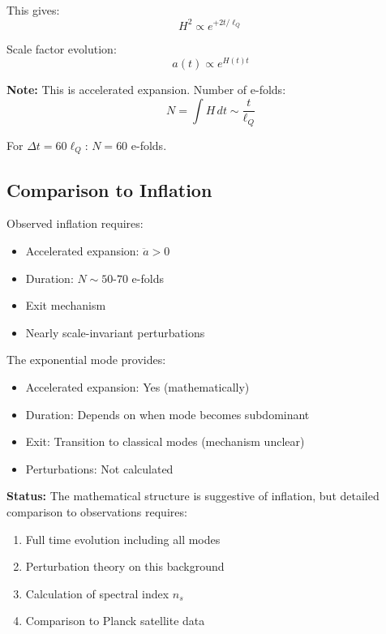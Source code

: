 \documentclass[11pt,a4paper]{article}
\theoremstyle{definition}
\theoremstyle{remark}
\begin{document}
	This gives:
	\begin{equation}
		H^2 \propto e^{+2t/\ell_Q}
	\end{equation}
	
	Scale factor evolution:
	\begin{equation}
		a(t) \propto e^{H(t)t}
	\end{equation}
	
	\textbf{Note:} This is accelerated expansion. Number of e-folds:
	\begin{equation}
		N = \int H\,dt \sim \frac{t}{\ell_Q}
	\end{equation}
	
	For $\Delta t = 60\ell_Q$: $N = 60$ e-folds.
	
	\subsection{Comparison to Inflation}
	
	Observed inflation requires:
	\begin{itemize}
		\item Accelerated expansion: $\ddot{a} > 0$
		\item Duration: $N \sim 50$-$70$ e-folds
		\item Exit mechanism
		\item Nearly scale-invariant perturbations
	\end{itemize}
	
	The exponential mode provides:
	\begin{itemize}
		\item Accelerated expansion: Yes (mathematically)
		\item Duration: Depends on when mode becomes subdominant
		\item Exit: Transition to classical modes (mechanism unclear)
		\item Perturbations: Not calculated
	\end{itemize}
	
	\textbf{Status:} The mathematical structure is suggestive of inflation, but detailed comparison to observations requires:
	\begin{enumerate}
		\item Full time evolution including all modes
		\item Perturbation theory on this background
		\item Calculation of spectral index $n_s$
		\item Comparison to Planck satellite data
	\end{enumerate}
	
\end{document}
